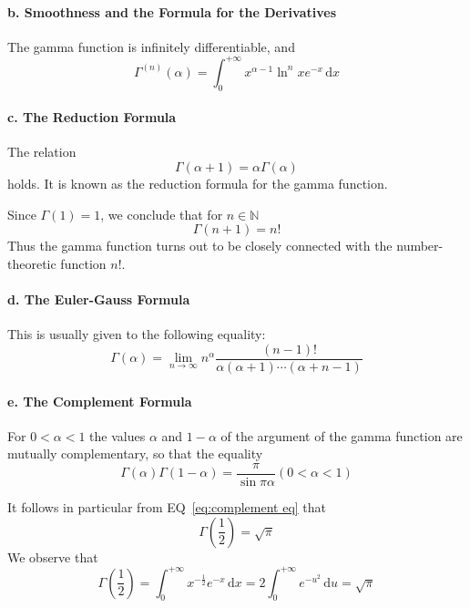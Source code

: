 \documentclass[a4paper,12pt]{article}
\begin{document}
\begin{CJK}{UTF8}{gbsn}
    \paragraph{\rm \textbf{b. Smoothness and the Formula for the Derivatives}}
    The gamma function is infinitely differentiable, and 
    \begin{equation}
        \Gamma^{(n)}(\alpha) = \int_0^{+\infty}x^{\alpha - 1} \ln^nx e^{-x}\, \mathrm{d}x
        \label{eq:dgamma}
    \end{equation}

    \paragraph{\rm \textbf{c. The Reduction Formula}}
    The relation 
    \[
        \Gamma(\alpha + 1) = \alpha\Gamma(\alpha)
        \]
    holds. It is known as the reduction formula for the gamma function.

    Since $\displaystyle \Gamma(1) = 1$, we conclude that for $n \in \mathbb{N}$
    \[
        \Gamma(n+1) = n!
        \]
    Thus the gamma function turns out to be closely connected with the 
    number-theoretic function $n!$.

    \paragraph{\rm \textbf{d. The Euler-Gauss Formula}}
    This is usually given to the following equality:
    \begin{equation}
        \Gamma(\alpha) = \lim_{n \to \infty} n^{\alpha}\frac{(n-1)!}{\alpha(\alpha+1)\cdots(\alpha+n-1)}
    \end{equation}

    \paragraph{\rm \textbf{e. The Complement Formula}}
    For $0 < \alpha < 1$ the values $\alpha$ and $1 - \alpha$ of the argument of the gamma
    function are mutually complementary, so that the equality 
    \begin{equation}
        \Gamma(\alpha)\Gamma(1-\alpha) = \frac{\pi}{\sin \pi\alpha} (0 < \alpha < 1)
        \label{eq:complement eq}
    \end{equation}

    It follows in particular from EQ~\ref{eq:complement eq} that 
    \[
        \Gamma\left(\frac{1}{2}\right) = \sqrt{\pi}
        \]
    We observe that 
    \[
        \Gamma\left(\frac{1}{2}\right) = \int_0^{+\infty}x^{-\frac{1}{2}}e^{-x}\, \mathrm{d}x
         = 2\int_0^{+\infty}e^{-u^2}\,\mathrm{d}u = \sqrt{\pi}
         \]


\end{CJK}
\end{document}
